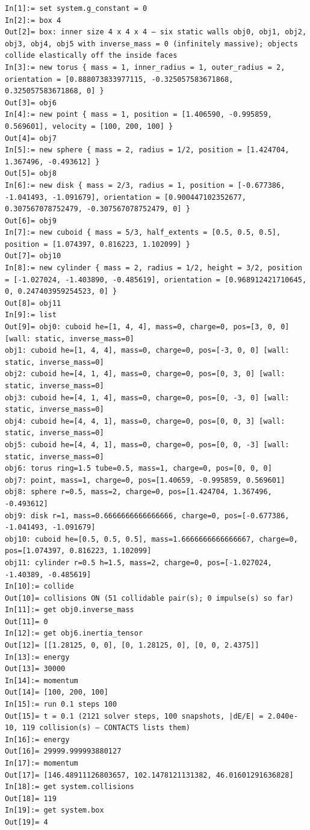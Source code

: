 \documentclass[11pt]{article}
\begin{document}
\begin{lstlisting}
In[1]:= set system.g_constant = 0
In[2]:= box 4
Out[2]= box: inner size 4 x 4 x 4 — six static walls obj0, obj1, obj2, obj3, obj4, obj5 with inverse_mass = 0 (infinitely massive); objects collide elastically off the inside faces
In[3]:= new torus { mass = 1, inner_radius = 1, outer_radius = 2, orientation = [0.888073833977115, -0.325057583671868, 0.325057583671868, 0] }
Out[3]= obj6
In[4]:= new point { mass = 1, position = [1.406590, -0.995859, 0.569601], velocity = [100, 200, 100] }
Out[4]= obj7
In[5]:= new sphere { mass = 2, radius = 1/2, position = [1.424704, 1.367496, -0.493612] }
Out[5]= obj8
In[6]:= new disk { mass = 2/3, radius = 1, position = [-0.677386, -1.041493, -1.091679], orientation = [0.900447102352677, 0.307567078752479, -0.307567078752479, 0] }
Out[6]= obj9
In[7]:= new cuboid { mass = 5/3, half_extents = [0.5, 0.5, 0.5], position = [1.074397, 0.816223, 1.102099] }
Out[7]= obj10
In[8]:= new cylinder { mass = 2, radius = 1/2, height = 3/2, position = [-1.027024, -1.403890, -0.485619], orientation = [0.968912421710645, 0, 0.247403959254523, 0] }
Out[8]= obj11
In[9]:= list
Out[9]= obj0: cuboid he=[1, 4, 4], mass=0, charge=0, pos=[3, 0, 0] [wall: static, inverse_mass=0]
obj1: cuboid he=[1, 4, 4], mass=0, charge=0, pos=[-3, 0, 0] [wall: static, inverse_mass=0]
obj2: cuboid he=[4, 1, 4], mass=0, charge=0, pos=[0, 3, 0] [wall: static, inverse_mass=0]
obj3: cuboid he=[4, 1, 4], mass=0, charge=0, pos=[0, -3, 0] [wall: static, inverse_mass=0]
obj4: cuboid he=[4, 4, 1], mass=0, charge=0, pos=[0, 0, 3] [wall: static, inverse_mass=0]
obj5: cuboid he=[4, 4, 1], mass=0, charge=0, pos=[0, 0, -3] [wall: static, inverse_mass=0]
obj6: torus ring=1.5 tube=0.5, mass=1, charge=0, pos=[0, 0, 0]
obj7: point, mass=1, charge=0, pos=[1.40659, -0.995859, 0.569601]
obj8: sphere r=0.5, mass=2, charge=0, pos=[1.424704, 1.367496, -0.493612]
obj9: disk r=1, mass=0.6666666666666666, charge=0, pos=[-0.677386, -1.041493, -1.091679]
obj10: cuboid he=[0.5, 0.5, 0.5], mass=1.6666666666666667, charge=0, pos=[1.074397, 0.816223, 1.102099]
obj11: cylinder r=0.5 h=1.5, mass=2, charge=0, pos=[-1.027024, -1.40389, -0.485619]
In[10]:= collide
Out[10]= collisions ON (51 collidable pair(s); 0 impulse(s) so far)
In[11]:= get obj0.inverse_mass
Out[11]= 0
In[12]:= get obj6.inertia_tensor
Out[12]= [[1.28125, 0, 0], [0, 1.28125, 0], [0, 0, 2.4375]]
In[13]:= energy
Out[13]= 30000
In[14]:= momentum
Out[14]= [100, 200, 100]
In[15]:= run 0.1 steps 100
Out[15]= t = 0.1 (2121 solver steps, 100 snapshots, |dE/E| = 2.040e-10, 119 collision(s) — CONTACTS lists them)
In[16]:= energy
Out[16]= 29999.999993880127
In[17]:= momentum
Out[17]= [146.48911126803657, 102.1478121131382, 46.01601291636828]
In[18]:= get system.collisions
Out[18]= 119
In[19]:= get system.box
Out[19]= 4
\end{lstlisting}
\end{document}
